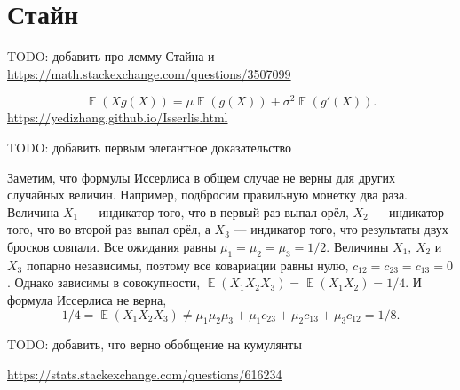 \documentclass[12pt]{article}
\DeclareMathOperator{\E}{\mathbb{E}}
\begin{document}
\section*{Стайн}

TODO: 
добавить про лемму Стайна и \url{https://math.stackexchange.com/questions/3507099}

\[
\E(X g(X)) = \mu \E(g(X)) + \sigma^2 \E(g'(X)).
\]
\url{https://yedizhang.github.io/Isserlis.html}

TODO: добавить первым элегантное доказательство


Заметим, что формулы Иссерлиса в общем случае не верны для других случайных величин.
Например, подбросим правильную монетку два раза. 
Величина $X_1$ — индикатор того, что в первый раз выпал орёл,
$X_2$ — индикатор того, что во второй раз выпал орёл,
а $X_3$ — индикатор того, что результаты двух бросков совпали.
Все ожидания равны $\mu_1 = \mu_2 = \mu_3 = 1/2$.
Величины $X_1$, $X_2$ и $X_3$ попарно независимы,
поэтому все ковариации равны нулю, $c_{12} = c_{23} = c_{13} = 0$.
Однако зависимы в совокупности,
$\E(X_1 X_2 X_3) = \E(X_1 X_2) = 1/4$.
И формула Иссерлиса не верна,
\[
1/4 = \E(X_1 X_2 X_3) \neq \mu_1 \mu_2 \mu_3 + \mu_1 c_{23} + \mu_2 c_{13} + \mu_3 c_{12} = 1/8.
\]

TODO: добавить, что верно обобщение на кумулянты

\url{https://stats.stackexchange.com/questions/616234}
\end{document}
